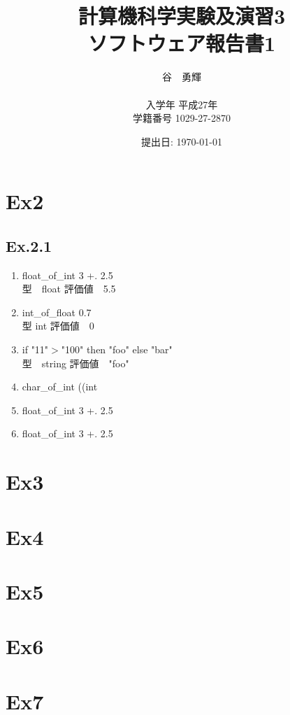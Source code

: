 \documentclass[a4j]{jarticle}
\begin{document}
\title{計算機科学実験及演習3 \\ \bf ソフトウェア報告書1}
\author{谷　勇輝 \\ \\入学年 平成27年 \\ 学籍番号 1029-27-2870}
\date{提出日: \today} %
\maketitle

\section{Ex2}
\subsection{Ex.2.1}
\begin{enumerate}
\item  float\_of\_int 3 +. 2.5 ~\\
型　float
評価値　5.5
\item  int\_of\_float 0.7 ~\\
型 int
評価値　0
\item  if "11"$>$"100" then "foo" else "bar" ~\\
型　string
評価値　"foo"
\item  char\_of\_int ((int ~\\
\item  float\_of\_int 3 +. 2.5 ~\\
\item  float\_of\_int 3 +. 2.5 ~\\
\end{enumerate}
\section{Ex3}
\section{Ex4}
\section{Ex5}
\section{Ex6}
\section{Ex7}
\end{document}
